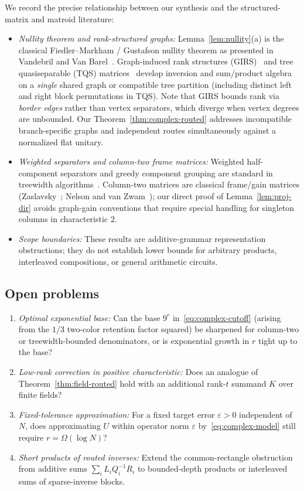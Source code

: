 \documentclass[11pt,reqno]{amsart}
\numberwithin{equation}{section}
\theoremstyle{definition}
\theoremstyle{remark}
\begin{document}
We record the precise relationship between our synthesis and the structured-matrix and matroid literature:
\begin{itemize}[leftmargin=1.5em]
\item \emph{Nullity theorem and rank-structured graphs:} Lemma~\ref{lem:nullity}(a) is the classical Fiedler--Markham / Gustafson nullity theorem as presented in Vandebril and Van Barel~\cite[Corollary~1]{VV04}. Graph-induced rank structures (GIRS)~\cite[Propositions~2.1--2.3]{CEG19} and tree quasiseparable (TQS) matrices~\cite[Theorem~4.4, Propositions~4.6--4.8]{GCD25} develop inversion and sum/product algebra on a \emph{single} shared graph or compatible tree partition (including distinct left and right block permutations in TQS). Note that GIRS bounds rank via \emph{border edges} rather than vertex separators, which diverge when vertex degrees are unbounded. Our Theorem~\ref{thm:complex-routed} addresses incompatible branch-specific graphs and independent routes simultaneously against a normalized flat unitary.
\item \emph{Weighted separators and column-two frame matrices:} Weighted half-component separators and greedy component grouping are standard in treewidth algorithms~\cite[Section~2.1]{BDDFLP16}. Column-two matrices are classical frame/gain matrices (Zaslavsky~\cite[Theorem~2.1(b)]{Zas03}; Nelson and van Zwam~\cite[Section~2]{NvZ15}); our direct proof of Lemma~\ref{lem:proj-dir} avoids graph-gain conventions that require special handling for singleton columns in characteristic $2$.
\item \emph{Scope boundaries:} These results are additive-grammar representation obstructions; they do not establish lower bounds for arbitrary products, interleaved compositions, or general arithmetic circuits.
\end{itemize}

\subsection*{Open problems}
\begin{enumerate}[label=(\arabic*),leftmargin=2em]
\item \emph{Optimal exponential base:} Can the base $9^r$ in~\eqref{eq:complex-cutoff} (arising from the $1/3$ two-color retention factor squared) be sharpened for column-two or treewidth-bounded denominators, or is exponential growth in $r$ tight up to the base?
\item \emph{Low-rank correction in positive characteristic:} Does an analogue of Theorem~\ref{thm:field-routed} hold with an additional rank-$t$ summand $K$ over finite fields?
\item \emph{Fixed-tolerance approximation:} For a fixed target error $\varepsilon > 0$ independent of $N$, does approximating $U$ within operator norm $\varepsilon$ by~\eqref{eq:complex-model} still require $r = \Omega(\log N)$?
\item \emph{Short products of routed inverses:} Extend the common-rectangle obstruction from additive sums $\sum_i L_i Q_i^{-1} R_i$ to bounded-depth products or interleaved sums of sparse-inverse blocks.
\end{enumerate}
\end{document}
